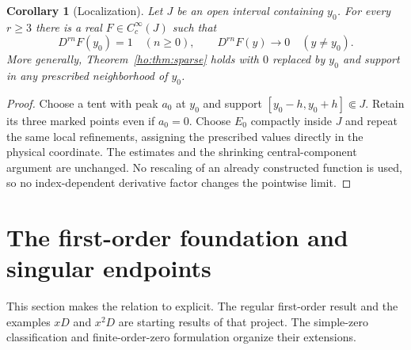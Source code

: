 \documentclass[11pt,reqno]{amsart}
\numberwithin{equation}{section}
\newtheorem{corollary}[theorem]{Corollary}
\theoremstyle{definition}
\theoremstyle{remark}
\begin{document}
\begin{corollary}[Localization]\label{cor:localized}
Let $J$ be an open interval containing $y_0$. For every $r\ge3$ there is a real $F\in C_c^\infty(J)$ such that
\[
 D^{rn}F(y_0)=1\quad(n\ge0),\qquad D^{rn}F(y)\longrightarrow0\quad(y\ne y_0).
\]
More generally, Theorem~\ref{ho:thm:sparse} holds with $0$ replaced by $y_0$ and support in any prescribed neighborhood of $y_0$.
\end{corollary}
\begin{proof}
Choose a tent with peak $a_0$ at $y_0$ and support $[y_0-h,y_0+h]\Subset J$. Retain its three marked points even if $a_0=0$. Choose $E_0$ compactly inside $J$ and repeat the same local refinements, assigning the prescribed values directly in the physical coordinate. The estimates and the shrinking central-component argument are unchanged. No rescaling of an already constructed function is used, so no index-dependent derivative factor changes the pointwise limit.
\end{proof}


\section{The first-order foundation and singular endpoints}\label{sec:firstorder}
This section makes the relation to \cite{project} explicit. The regular first-order result and the examples $xD$ and $x^2D$ are starting results of that project. The simple-zero classification and finite-order-zero formulation organize their extensions.
\end{document}
